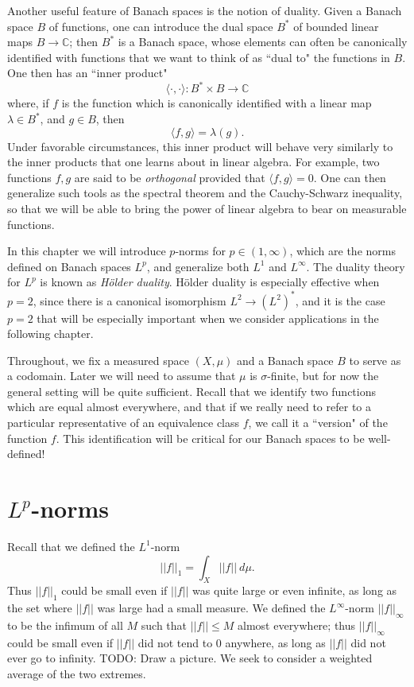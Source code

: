 \documentclass[12pt]{book}
\newcommand{\CC}{\mathbb{C}}
\newcommand{\dfn}[1]{\emph{#1}\index{#1}}
\theoremstyle{definition}
\begin{document}
Another useful feature of Banach spaces is the notion of duality.
Given a Banach space $B$ of functions, one can introduce the dual space $B^*$ of bounded linear maps $B \to \CC$; then $B^*$ is a Banach space, whose elements can often be canonically identified with functions that we want to think of as ``dual to" the functions in $B$.
One then has an ``inner product"
$$\langle \cdot, \cdot\rangle: B^* \times B \to \CC$$
where, if $f$ is the function which is canonically identified with a linear map $\lambda \in B^*$, and $g \in B$, then
$$\langle f, g\rangle = \lambda(g).$$
Under favorable circumstances, this inner product will behave very similarly to the inner products that one learns about in linear algebra.
For example, two functions $f, g$ are said to be \dfn{orthogonal} provided that $\langle f, g\rangle = 0$.
One can then generalize such tools as the spectral theorem and the Cauchy-Schwarz inequality, so that we will be able to bring the power of linear algebra to bear on measurable functions.

In this chapter we will introduce $p$-norms for $p \in (1, \infty)$, which are the norms defined on Banach spaces $L^p$, and generalize both $L^1$ and $L^\infty$.
The duality theory for $L^p$ is known as \dfn{H\"older duality}.
H\"older duality is especially effective when $p = 2$, since there is a canonical isomorphism $L^2 \to (L^2)^*$, and it is the case $p = 2$ that will be especially important when we consider applications in the following chapter.

Throughout, we fix a measured space $(X, \mu)$ and a Banach space $B$ to serve as a codomain.
Later we will need to assume that $\mu$ is $\sigma$-finite, but for now the general setting will be quite sufficient.
Recall that we identify two functions which are equal almost everywhere, and that if we really need to refer to a particular representative of an equivalence class $f$, we call it a ``version" of the function $f$.
This identification will be critical for our Banach spaces to be well-defined!

\section{$L^p$-norms}
Recall that we defined the $L^1$-norm
$$||f||_1 = \int_X ||f||~d\mu.$$
Thus $||f||_1$ could be small even if $||f||$ was quite large or even infinite, as long as the set where $||f||$ was large had a small measure.
We defined the $L^\infty$-norm $||f||_\infty$ to be the infimum of all $M$ such that $||f|| \leq M$ almost everywhere; thus $||f||_\infty$ could be small even if $||f||$ did not tend to $0$ anywhere, as long as $||f||$ did not ever go to infinity.
TODO: Draw a picture.
We seek to consider a weighted average of the two extremes.
\end{document}
